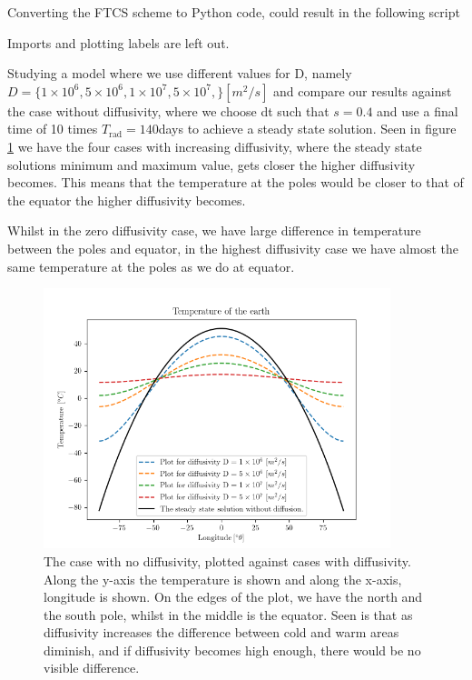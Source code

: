 \documentclass[10pt, a4paper]{amsart}
\begin{document}
Converting the FTCS scheme to Python code, could result in the following script

Imports and plotting labels are left out.

Studying a model where we use different values for D, namely $D = \lbrace1\times 10^6, 5\times 10^6, 1\times 10^7, 5\times 10^7,\rbrace[m^2/s]$ and compare our results against the case without diffusivity, where we choose dt such that $s = 0.4$ and use a final time of 10 times $T_{\text{rad}} = 140$days\cite{joe} to achieve a steady state solution. 
Seen in figure \ref{fig:1a} we have the four cases with increasing diffusivity, where the steady state solutions minimum and maximum value, gets closer the higher diffusivity becomes. This means that the temperature at the poles would be closer to that of the equator the higher diffusivity becomes. 

Whilst in the zero diffusivity case, we have large difference in temperature between the poles and equator, in the highest diffusivity case we have almost the same temperature at the poles as we do at equator. 
\begin{figure}
	\centering
	\includegraphics[width=0.9\textwidth]{../code/Figure_1.png}
	\caption{The case with no diffusivity, plotted against cases with diffusivity. Along the y-axis the temperature is shown and along the x-axis, longitude is shown. On the edges of the plot, we have the north and the south pole, whilst in the middle is the equator. Seen is that as diffusivity increases the difference between cold and warm areas diminish, and if diffusivity becomes high enough, there would be no visible difference.}
	\label{fig:1a}
\end{figure}
\end{document}
